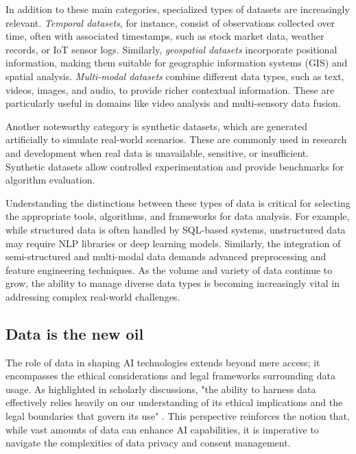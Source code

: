 In addition to these main categories, specialized types of datasets are increasingly relevant. \textit{Temporal datasets}, for instance, consist of observations collected over time, often with associated timestamps, such as stock market data, weather records, or IoT sensor logs. Similarly, \textit{geospatial datasets} incorporate positional information, making them suitable for geographic information systems (GIS) and spatial analysis. \textit{Multi-modal datasets} combine different data types, such as text, videos, images, and audio, to provide richer contextual information. These are particularly useful in domains like video analysis and multi-sensory data fusion.

Another noteworthy category is synthetic datasets, which are generated artificially to simulate real-world scenarios. These are commonly used in research and development when real data is unavailable, sensitive, or insufficient. Synthetic datasets allow controlled experimentation and provide benchmarks for algorithm evaluation.

Understanding the distinctions between these types of data is critical for selecting the appropriate tools, algorithms, and frameworks for data analysis. For example, while structured data is often handled by SQL-based systems, unstructured data may require NLP libraries or deep learning models. Similarly, the integration of semi-structured and multi-modal data demands advanced preprocessing and feature engineering techniques. As the volume and variety of data continue to grow, the ability to manage diverse data types is becoming increasingly vital in addressing complex real-world challenges.
\subsection{Data is the new oil}
The role of data in shaping AI technologies extends beyond mere access; it encompasses the ethical considerations and legal frameworks surrounding data usage. As highlighted in scholarly discussions, "the ability to harness data effectively relies heavily on our understanding of its ethical implications and the legal boundaries that govern its use" \cite{heinonline2024}. This perspective reinforces the notion that, while vast amounts of data can enhance AI capabilities, it is imperative to navigate the complexities of data privacy and consent management. 

